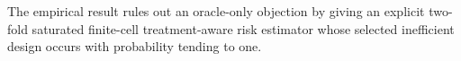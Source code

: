 The empirical result rules out an oracle-only objection by giving an explicit two-fold saturated finite-cell treatment-aware risk estimator whose selected inefficient design occurs with probability tending to one.